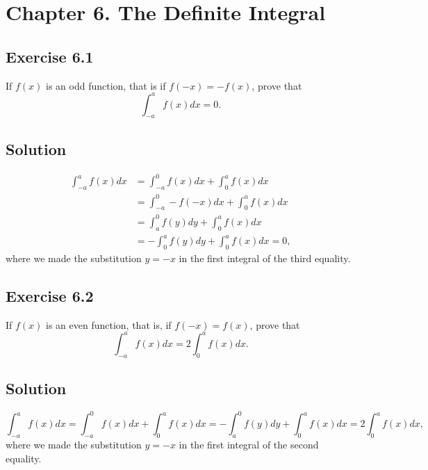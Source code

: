 \section*{Chapter 6. The Definite Integral}

\subsection*{Exercise 6.1}

If $f(x)$ is an odd function, that is if $f(-x) = -f(x)$, prove that
\begin{equation*}
    \int_{-a}^a f(x) dx = 0.
\end{equation*}

\subsection*{Solution}
\begin{equation*}
    \begin{split}
        \int_{-a}^a f(x) dx
            &= \int_{-a}^0 f(x) dx + \int_0^a f(x) dx \\
            &= \int_{-a}^0 -f(-x) dx + \int_0^a f(x) dx \\
            &= \int_a^0 f(y) dy + \int_0^a f(x) dx \\
            &= -\int_0^a f(y) dy + \int_0^a f(x) dx
            = 0,
    \end{split}
\end{equation*}
where we made the substitution $y = -x$ in the first integral of the third equality.


\subsection*{Exercise 6.2}

If $f(x)$ is an even function, that is, if $f(-x) = f(x)$, prove that
\begin{equation*}
    \int_{-a}^a f(x) dx = 2 \int_0^a f(x) dx.
\end{equation*}

\subsection*{Solution}

\begin{equation*}
    \int_{-a}^a f(x) dx
        = \int_{-a}^0 f(x) dx + \int_{0}^{a} f(x)dx
        = -\int_a^0 f(y)dy + \int_0^a f(x)dx
        = 2\int_0^a f(x)dx,
\end{equation*}
where we made the substitution $y = -x$ in the first integral of the second equality.


